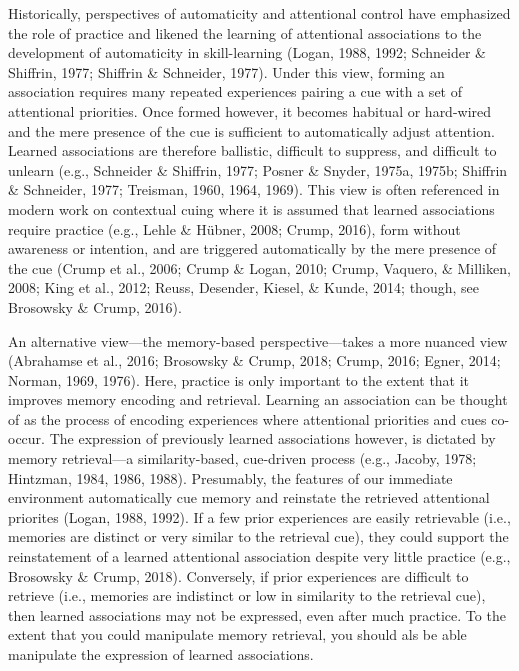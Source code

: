 \documentclass[english,,man,floatsintext]{apa6}
\begin{document}
Historically, perspectives of automaticity and attentional control have emphasized the role of practice and likened the learning of attentional associations to the development of automaticity in skill-learning (Logan, 1988, 1992; Schneider \& Shiffrin, 1977; Shiffrin \& Schneider, 1977). Under this view, forming an association requires many repeated experiences pairing a cue with a set of attentional priorities. Once formed however, it becomes habitual or hard-wired and the mere presence of the cue is sufficient to automatically adjust attention. Learned associations are therefore ballistic, difficult to suppress, and difficult to unlearn (e.g., Schneider \& Shiffrin, 1977; Posner \& Snyder, 1975a, 1975b; Shiffrin \& Schneider, 1977; Treisman, 1960, 1964, 1969). This view is often referenced in modern work on contextual cuing where it is assumed that learned associations require practice (e.g., Lehle \& Hübner, 2008; Crump, 2016), form without awareness or intention, and are triggered automatically by the mere presence of the cue (Crump et al., 2006; Crump \& Logan, 2010; Crump, Vaquero, \& Milliken, 2008; King et al., 2012; Reuss, Desender, Kiesel, \& Kunde, 2014; though, see Brosowsky \& Crump, 2016).

An alternative view---the memory-based perspective---takes a more nuanced view (Abrahamse et al., 2016; Brosowsky \& Crump, 2018; Crump, 2016; Egner, 2014; Norman, 1969, 1976). Here, practice is only important to the extent that it improves memory encoding and retrieval. Learning an association can be thought of as the process of encoding experiences where attentional priorities and cues co-occur. The expression of previously learned associations however, is dictated by memory retrieval---a similarity-based, cue-driven process (e.g., Jacoby, 1978; Hintzman, 1984, 1986, 1988). Presumably, the features of our immediate environment automatically cue memory and reinstate the retrieved attentional priorites (Logan, 1988, 1992). If a few prior experiences are easily retrievable (i.e., memories are distinct or very similar to the retrieval cue), they could support the reinstatement of a learned attentional association despite very little practice (e.g., Brosowsky \& Crump, 2018). Conversely, if prior experiences are difficult to retrieve (i.e., memories are indistinct or low in similarity to the retrieval cue), then learned associations may not be expressed, even after much practice. To the extent that you could manipulate memory retrieval, you should als be able manipulate the expression of learned associations.
\end{document}
